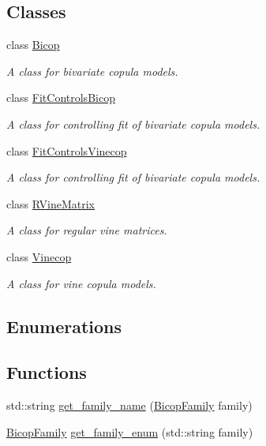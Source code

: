 \subsection*{Classes}
\begin{DoxyCompactItemize}
\item 
class \hyperlink{classvinecopulib_1_1_bicop}{Bicop}
\begin{DoxyCompactList}\small\item\em A class for bivariate copula models. \end{DoxyCompactList}\item 
class \hyperlink{classvinecopulib_1_1_fit_controls_bicop}{Fit\+Controls\+Bicop}
\begin{DoxyCompactList}\small\item\em A class for controlling fit of bivariate copula models. \end{DoxyCompactList}\item 
class \hyperlink{classvinecopulib_1_1_fit_controls_vinecop}{Fit\+Controls\+Vinecop}
\begin{DoxyCompactList}\small\item\em A class for controlling fit of bivariate copula models. \end{DoxyCompactList}\item 
class \hyperlink{classvinecopulib_1_1_r_vine_matrix}{R\+Vine\+Matrix}
\begin{DoxyCompactList}\small\item\em A class for regular vine matrices. \end{DoxyCompactList}\item 
class \hyperlink{classvinecopulib_1_1_vinecop}{Vinecop}
\begin{DoxyCompactList}\small\item\em A class for vine copula models. \end{DoxyCompactList}\end{DoxyCompactItemize}
\subsection*{Enumerations}
\subsection*{Functions}
\begin{DoxyCompactItemize}
\item 
std\+::string \hyperlink{namespacevinecopulib_ac46553ae5f99072f65e9d3254d2c526d}{get\+\_\+family\+\_\+name} (\hyperlink{namespacevinecopulib_a42e95cc06d33896199caab0c11ad44f3}{Bicop\+Family} family)
\item 
\hyperlink{namespacevinecopulib_a42e95cc06d33896199caab0c11ad44f3}{Bicop\+Family} \hyperlink{namespacevinecopulib_a8d5285a58e0d250a5226715754e12568}{get\+\_\+family\+\_\+enum} (std\+::string family)
\end{DoxyCompactItemize}


